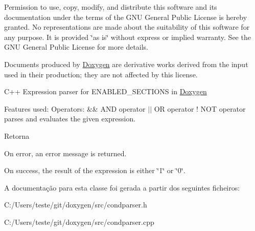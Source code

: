 Permission to use, copy, modify, and distribute this software and its documentation under the terms of the G\-N\-U General Public License is hereby granted. No representations are made about the suitability of this software for any purpose. It is provided \char`\"{}as is\char`\"{} without express or implied warranty. See the G\-N\-U General Public License for more details.

Documents produced by \hyperlink{class_doxygen}{Doxygen} are derivative works derived from the input used in their production; they are not affected by this license.

C++ Expression parser for E\-N\-A\-B\-L\-E\-D\-\_\-\-S\-E\-C\-T\-I\-O\-N\-S in \hyperlink{class_doxygen}{Doxygen}

Features used\-: Operators\-: \&\& A\-N\-D operator $|$$|$ O\-R operator ! N\-O\-T operator parses and evaluates the given expression. \begin{DoxyReturn}{Retorna}

\begin{DoxyItemize}
\item On error, an error message is returned.
\item On success, the result of the expression is either \char`\"{}1\char`\"{} or \char`\"{}0\char`\"{}. 
\end{DoxyItemize}
\end{DoxyReturn}


A documentação para esta classe foi gerada a partir dos seguintes ficheiros\-:\begin{DoxyCompactItemize}
\item 
C\-:/\-Users/teste/git/doxygen/src/condparser.\-h\item 
C\-:/\-Users/teste/git/doxygen/src/condparser.\-cpp\end{DoxyCompactItemize}
